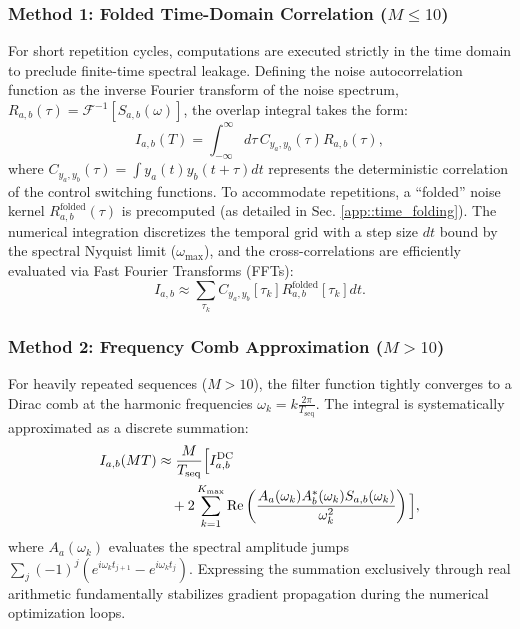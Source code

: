 \documentclass[%
 reprint,
superscriptaddress,
 amsmath,amssymb,
 aps,
pra,
]{revtex4-2}
\begin{document}
\subsubsection{Method 1: Folded Time-Domain Correlation ($M \le 10$)}
For short repetition cycles, computations are executed strictly in the time domain to preclude finite-time spectral leakage. Defining the noise autocorrelation function as the inverse Fourier transform of the noise spectrum, $R_{a,b}(\tau) = \mathcal{F}^{-1}[S_{a,b}(\omega)]$, the overlap integral takes the form:
\begin{equation}
    I_{a,b}(T) = \int_{-\infty}^{\infty} d\tau \, C_{y_a, y_b}(\tau) R_{a,b}(\tau),
\end{equation}
where $C_{y_a, y_b}(\tau) = \int y_a(t) y_b(t+\tau) dt$ represents the deterministic correlation of the control switching functions. To accommodate repetitions, a ``folded'' noise kernel $R^{\text{folded}}_{a,b}(\tau)$ is precomputed (as detailed in Sec. \ref{app::time_folding}). The numerical integration discretizes the temporal grid with a step size $dt$ bound by the spectral Nyquist limit ($\omega_{\max}$), and the cross-correlations are efficiently evaluated via Fast Fourier Transforms (FFTs):
\begin{equation}
    I_{a,b} \approx \sum_{\tau_k} C_{y_a, y_b}[\tau_k] R^{\text{folded}}_{a,b}[\tau_k] dt.
\end{equation}

\subsubsection{Method 2: Frequency Comb Approximation ($M > 10$)}
For heavily repeated sequences ($M > 10$), the filter function tightly converges to a Dirac comb at the harmonic frequencies $\omega_k = k \frac{2\pi}{T_{\text{seq}}}$. The integral is systematically approximated as a discrete summation:
\begin{align}
    I_{a,b}(MT) &\approx \frac{M}{T_{\text{seq}}} \Big[ I^{\text{DC}}_{a,b} \notag\\
    &\quad+ 2 \sum_{k=1}^{K_{\max}} \text{Re}\left( \frac{A_a(\omega_k) A_b^*(\omega_k) S_{a,b}(\omega_k)}{\omega_k^2} \right) \Big],
\end{align}
where $A_a(\omega_k)$ evaluates the spectral amplitude jumps $\sum_j (-1)^j (e^{i\omega_k t_{j+1}} - e^{i\omega_k t_j})$. Expressing the summation exclusively through real arithmetic fundamentally stabilizes gradient propagation during the numerical optimization loops.
\end{document}
